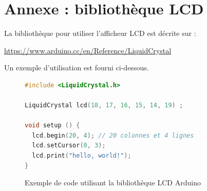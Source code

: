 \documentclass[11pt]{paper}
\begin{document}
\newpage
\section{Annexe : bibliothèque LCD}

La bibliothèque pour utiliser l'afficheur LCD est décrite sur :

\href{https://www.arduino.cc/en/Reference/LiquidCrystal}{https://www.arduino.cc/en/Reference/LiquidCrystal}

Un exemple d'utilisation est fourni ci-dessous.

\begin{figure}[htbp]
\begin{center}

\begin{lstlisting}[language=C]
#include <LiquidCrystal.h>

LiquidCrystal lcd(18, 17, 16, 15, 14, 19) ;

void setup () {
  lcd.begin(20, 4); // 20 colonnes et 4 lignes
  lcd.setCursor(0, 3);
  lcd.print("hello, world!");
}
\end{lstlisting}

\caption{Exemple de code utilisant la bibliothèque LCD Arduino}
\label{fig:code_lcd}
\end{center}
\end{figure}
\end{document}
